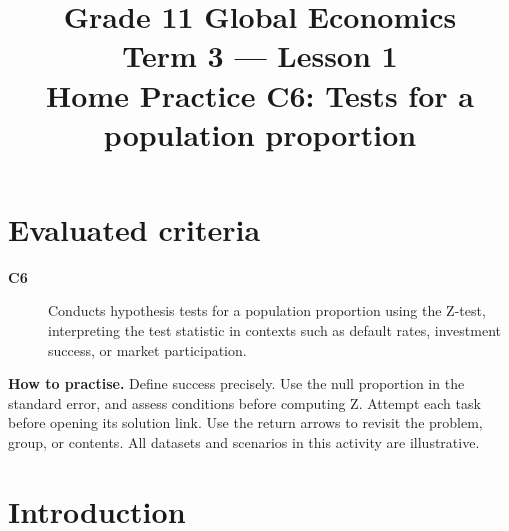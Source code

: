 \makeatletter
{}
\makeatother


\newcommand{\Pop}[1]{\HighlightStroke{GTenHLParameter}{#1}}
\newcommand{\Obs}[1]{\HighlightStroke{GTenHLValue}{#1}}
\newcommand{\Design}[1]{\HighlightStroke{GTenHLThird}{#1}}
\newcommand{\Result}[1]{\HighlightStroke{GTenHLOutcome}{#1}}

\title{Grade 11 Global Economics\\Term 3 --- Lesson 1\\Home Practice C6: Tests for a population proportion}
\author{}\date{}

\maketitle
\setcounter{tocdepth}{1}
\setcounter{secnumdepth}{2}
\label{toc}
\tableofcontents
\section*{Evaluated criteria}
\begin{description}
\item[\textbf{C6}] Conducts hypothesis tests for a population proportion using the Z-test, interpreting the test statistic in contexts such as default rates, investment success, or market participation.
\end{description}
\textbf{How to practise.} Define success precisely. Use the null proportion in the standard error, and assess conditions before computing Z. Attempt each task before opening its solution link. Use the return arrows to revisit the problem, group, or contents. All datasets and scenarios in this activity are illustrative.
\clearpage
\section{Introduction}\label{sec:introduction}
